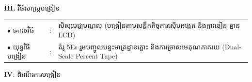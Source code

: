 \documentclass[a4paper,10pt]{article}
\newcommand{\en}[1]{{\TimesEn #1}}
\begin{document}
{\vspace{2pt}

\textbf{III.} {\muol វិធីសាស្រ្តបង្រៀន}\\[1pt]
\hspace*{0.45cm}%
\begin{tabular}{@{}l l L{14.85cm}@{}}
  $\bullet$ \hspace{0.25cm} គោលវិធី & : & សិស្សមជ្ឈមណ្ឌល (បង្រៀនតាមសន្លឹកកិច្ចការស៊ើបអង្កេត និងក្ដារខៀន គ្មាន \en{LCD}) \\
  $\bullet$ \hspace{0.25cm} យុទ្ធវិធីបង្រៀន & : & គំរូ \en{5Es} រួមបញ្ចូលបន្ទះមាត្រដ្ឋានភ្លោះ និងការច្រាសមេគុណភាគរយ (\en{Dual-Scale Percent Tape}) \\
\end{tabular}
}

\vspace{2pt}

\textbf{IV.} {\muol ដំណើរការបង្រៀន}

\vspace{1pt}
\end{document}
